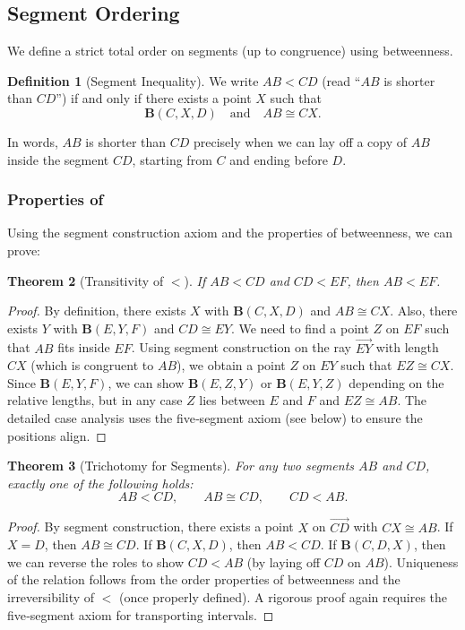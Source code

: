 \documentclass[12pt, letterpaper]{article}
\newtheorem{theorem}{Theorem}[section]
\theoremstyle{definition}
\newtheorem{definition}[theorem]{Definition}
\newcommand{\ray}[1]{\overrightarrow{#1}}
\begin{document}
\subsection{Segment Ordering}
We define a strict total order on segments (up to congruence) using betweenness.

\begin{definition}[Segment Inequality]
We write $AB < CD$ (read “$AB$ is shorter than $CD$”) if and only if there exists a point $X$ such that
\[
\mathbf{B}(C,X,D) \quad\text{and}\quad AB \cong CX .
\]
\end{definition}

In words, $AB$ is shorter than $CD$ precisely when we can lay off a copy of $AB$ inside the segment $CD$, starting from $C$ and ending before $D$.

\subsubsection{Properties of}
Using the segment construction axiom and the properties of betweenness, we can prove:

\begin{theorem}[Transitivity of $<$]
If $AB < CD$ and $CD < EF$, then $AB < EF$.
\end{theorem}
\begin{proof}
By definition, there exists $X$ with $\mathbf{B}(C,X,D)$ and $AB \cong CX$. Also, there exists $Y$ with $\mathbf{B}(E,Y,F)$ and $CD \cong EY$.
We need to find a point $Z$ on $EF$ such that $AB$ fits inside $EF$. Using segment construction on the ray $\ray{EY}$ with length $CX$ (which is congruent to $AB$), we obtain a point $Z$ on $EY$ such that $EZ \cong CX$. Since $\mathbf{B}(E,Y,F)$, we can show $\mathbf{B}(E,Z,Y)$ or $\mathbf{B}(E,Y,Z)$ depending on the relative lengths, but in any case $Z$ lies between $E$ and $F$ and $EZ \cong AB$. The detailed case analysis uses the five‑segment axiom (see below) to ensure the positions align.
\end{proof}

\begin{theorem}[Trichotomy for Segments]
For any two segments $AB$ and $CD$, exactly one of the following holds:
\[
AB < CD,\qquad AB \cong CD,\qquad CD < AB .
\]
\end{theorem}
\begin{proof}
By segment construction, there exists a point $X$ on $\ray{CD}$ with $CX \cong AB$. If $X=D$, then $AB \cong CD$. If $\mathbf{B}(C,X,D)$, then $AB < CD$. If $\mathbf{B}(C,D,X)$, then we can reverse the roles to show $CD < AB$ (by laying off $CD$ on $AB$). Uniqueness of the relation follows from the order properties of betweenness and the irreversibility of $<$ (once properly defined). A rigorous proof again requires the five‑segment axiom for transporting intervals.
\end{proof}
\end{document}
